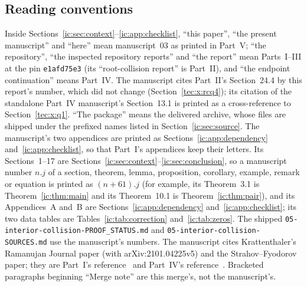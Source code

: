 \documentclass[11pt,a4paper]{article}
\numberwithin{equation}{section}
\theoremstyle{definition}
\theoremstyle{remark}
\begin{document}
\subsection{Reading conventions}\label{ic:sec:reading}
Inside Sections~\ref{ic:sec:context}--\ref{ic:app:checklist}, ``this
paper'', ``the present manuscript'' and ``here'' mean manuscript~03 as
printed in Part~V; ``the repository'', ``the inspected repository reports''
and ``the report'' mean Parts~I--III at the pin \texttt{e1afd75e3} (its
``root-collision report'' is Part~II), and ``the endpoint continuation''
means Part~IV.  The manuscript cites Part~II's Section~24.4 by this report's
number, which did not change (Section~\ref{tec:x:rcq4}); its citation of the
standalone Part~IV manuscript's Section~13.1 is printed as a
cross-reference to Section~\ref{tec:x:q1}.  ``The package'' means the
delivered archive, whose files are shipped under the prefixed names listed in
Section~\ref{ic:sec:source}.  The manuscript's two appendices are printed as
Sections~\ref{ic:app:dependency} and~\ref{ic:app:checklist}, so that Part~I's
appendices keep their letters.  Its Sections~1--17 are
Sections~\ref{ic:sec:context}--\ref{ic:sec:conclusion}, so a manuscript
number $n.j$ of a section, theorem, lemma, proposition, corollary, example,
remark or equation is printed as $(n+61).j$ (for example, its Theorem~3.1 is
Theorem~\ref{ic:thm:main} and its Theorem~10.1 is Theorem~\ref{ic:thm:pair}),
and its Appendices~A and~B are Sections~\ref{ic:app:dependency}
and~\ref{ic:app:checklist}; its two data tables are
Tables~\ref{ic:tab:correction} and~\ref{ic:tab:zeros}.  The shipped
\nolinkurl{05-interior-collision-PROOF_STATUS.md} and
\nolinkurl{05-interior-collision-SOURCES.md} use the manuscript's numbers.
The manuscript cites Krattenthaler's Ramanujan Journal paper (with
arXiv:2101.04225v5) and the Strahov--Fyodorov paper; they are Part~I's
reference~\cite{Krattenthaler2023} and Part~IV's
reference~\cite{StrahovFyodorov2003}.  Bracketed paragraphs beginning
``Merge note'' are this merge's, not the manuscript's.
\end{document}
